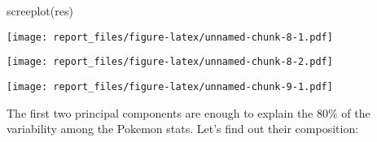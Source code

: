\documentclass[
]{article}
\newenvironment{Shaded}{\begin{snugshade}}{\end{snugshade}}
\newcommand{\AttributeTok}[1]{\textcolor[rgb]{0.77,0.63,0.00}{#1}}
\newcommand{\DecValTok}[1]{\textcolor[rgb]{0.00,0.00,0.81}{#1}}
\newcommand{\FloatTok}[1]{\textcolor[rgb]{0.00,0.00,0.81}{#1}}
\newcommand{\FunctionTok}[1]{\textcolor[rgb]{0.00,0.00,0.00}{#1}}
\newcommand{\NormalTok}[1]{#1}
\newcommand{\OtherTok}[1]{\textcolor[rgb]{0.56,0.35,0.01}{#1}}
\newcommand{\SpecialCharTok}[1]{\textcolor[rgb]{0.00,0.00,0.00}{#1}}
\newcommand{\StringTok}[1]{\textcolor[rgb]{0.31,0.60,0.02}{#1}}
\begin{document}
\begin{Shaded}
\begin{Highlighting}[]
\FunctionTok{screeplot}\NormalTok{(res)}
\end{Highlighting}
\end{Shaded}

\texttt{[image: report\_files/figure-latex/unnamed-chunk-8-1.pdf]}

\begin{Shaded}
\end{Shaded}

\texttt{[image: report\_files/figure-latex/unnamed-chunk-8-2.pdf]}

\begin{Shaded}
\end{Shaded}

\texttt{[image: report\_files/figure-latex/unnamed-chunk-9-1.pdf]}

The first two principal components are enough to explain the 80\% of the
variability among the Pokemon stats. Let's find out their composition:

\begin{Shaded}
\end{Shaded}
\end{document}
